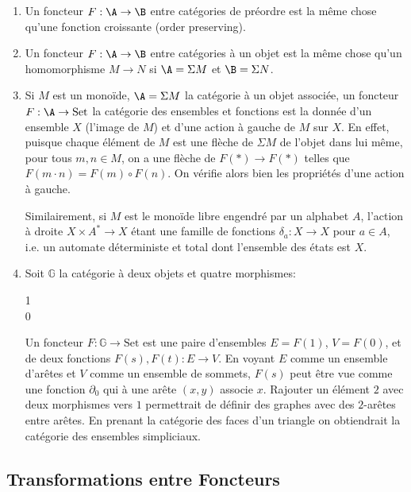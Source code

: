 \documentclass[math]{cours}
\begin{document}
\begin{exemple}
	\begin{enumerate}
		\item Un foncteur $F : \A \to \B$ entre catégories de préordre est la même chose qu'une fonction croissante (order preserving).
		\item Un foncteur $F : \A \to \B$ entre catégories à un objet est la même chose qu'un homomorphisme $M \to N$ si $\A = \Sigma M$ et $\B = \Sigma N$.
		\item Si $M$ est un monoïde, $\A = \Sigma M$ la catégorie à un objet associée, un foncteur $F: \A \to \mathrm{Set}$ la catégorie des ensembles et fonctions est la donnée d'un ensemble $X$ (l'image de $M$) et d'une action à gauche de $M$ sur $X$.
			En effet, puisque chaque élément de $M$ est une flèche de $\Sigma M$ de l'objet dans lui même, pour tous $m, n \in M$, on a une flèche de $F(*)\to F(*)$ telles que $F(m\cdot n) = F(m) \circ F(n)$.
			On vérifie alors bien les propriétés d'une action à gauche.

			Similairement, si $M$ est le monoïde libre engendré par un alphabet $A$, l'action à droite $X \times A^{*} \to X$ étant une famille de fonctions $\delta_{a} : X \to X$ pour $a \in A$, i.e. un automate déterministe et total dont l'ensemble des états est $X$.
		\item Soit $\mathbb{G}$ la catégorie à deux objets et quatre morphismes:
			\begin{category}[]
				1\\
				0
			\end{category}
			Un foncteur $F:\mathbb{G} \to \mathrm{Set}$ est une paire d'ensembles $E= F(1)$, $V = F(0)$, et de deux fonctions $F(s), F(t): E \to V$.
			En voyant $E$ comme un ensemble d'arêtes et $V$ comme un ensemble de sommets, $F(s)$ peut être vue comme une fonction $\partial_{0}$ qui à une arête $(x, y)$ associe $x$.
			Rajouter un élément $2$ avec deux morphismes vers $1$ permettrait de définir des graphes avec des $2$-arêtes entre arêtes.
			En prenant la catégorie des faces d'un triangle on obtiendrait la catégorie des ensembles simpliciaux.
	\end{enumerate}
\end{exemple}

\subsection{Transformations entre Foncteurs}
\end{document}
